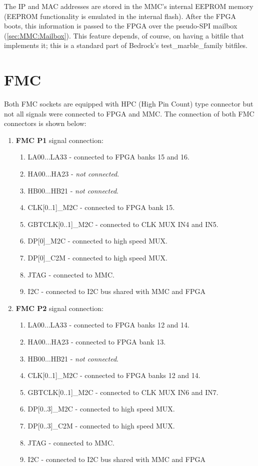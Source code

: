 \documentclass[12pt,oneside,a4]{article}
\begin{document}
The IP and MAC addresses are stored in the MMC's internal EEPROM memory (EEPROM functionality is emulated in the internal flash).
After the FPGA boots, this information is passed to the FPGA over the pseudo-SPI mailbox (\ref{sec:MMC:Mailbox}).
This feature depends, of course, on having a bitfile that implements it; this is a standard part of Bedrock's test\_marble\_family bitfiles.

\section{FMC}
Both FMC sockets are equipped with HPC (High Pin Count) type connector but not all signals were connected to FPGA and MMC.
The connection of both FMC connectors is shown below:
\begin{enumerate}
    \item \textbf{FMC P1} signal connection:
    \begin{enumerate}
        \item LA00...LA33 - connected to FPGA banks 15 and 16.
        \item HA00...HA23 - \textit{not connected}.
        \item HB00...HB21 - \textit{not connected}.
        \item CLK[0..1]\_M2C - connected to FPGA bank 15.
        \item GBTCLK[0..1]\_M2C - connected to CLK MUX IN4 and IN5.
        \item DP[0]\_M2C - connected to high speed MUX.
        \item DP[0]\_C2M - connected to high speed MUX.
        \item JTAG - connected to MMC.
        \item I2C - connected to I2C bus shared with MMC and FPGA
    \end{enumerate}
    \item \textbf{FMC P2} signal connection:
    \begin{enumerate}
        \item LA00...LA33 - connected to FPGA banks 12 and 14.
        \item HA00...HA23 - connected to FPGA bank 13.
        \item HB00...HB21 - \textit{not connected}.
        \item CLK[0..1]\_M2C - connected to FPGA banks 12 and 14.
        \item GBTCLK[0..1]\_M2C - connected to CLK MUX IN6 and IN7.
        \item DP[0..3]\_M2C - connected to high speed MUX.
        \item DP[0..3]\_C2M - connected to high speed MUX.
        \item JTAG - connected to MMC.
        \item I2C - connected to I2C bus shared with MMC and FPGA
    \end{enumerate}
\end{enumerate}
\end{document}

